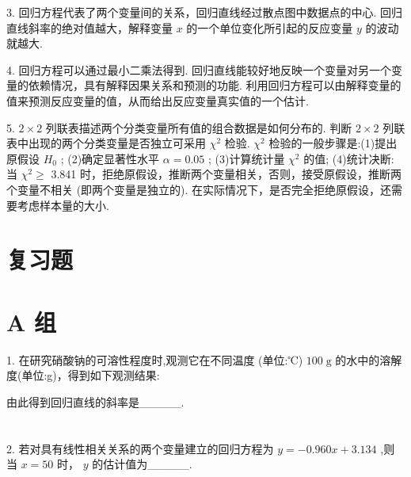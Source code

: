 \documentclass[10pt]{article}
\begin{document}
3. 回归方程代表了两个变量间的关系，回归直线经过散点图中数据点的中心. 回归直线斜率的绝对值越大，解释变量 \(x\) 的一个单位变化所引起的反应变量 \(y\) 的波动就越大.

4. 回归方程可以通过最小二乘法得到. 回归直线能较好地反映一个变量对另一个变量的依赖情况，具有解释因果关系和预测的功能. 利用回归方程可以由解释变量的值来预测反应变量的值，从而给出反应变量真实值的一个估计.

5. \(2 \times  2\) 列联表描述两个分类变量所有值的组合数据是如何分布的. 判断 \(2 \times  2\) 列联表中出现的两个分类变量是否独立可采用 \({\chi }^{2}\) 检验. \({\chi }^{2}\) 检验的一般步骤是:(1)提出原假设 \({H}_{0}\) ; (2)确定显著性水平 \(\alpha  = {0.05}\) ; (3)计算统计量 \({\chi }^{2}\) 的值; (4)统计决断: 当 \({\chi }^{2} \geq\) 3.841 时，拒绝原假设，推断两个变量相关，否则，接受原假设，推断两个变量不相关 (即两个变量是独立的). 在实际情况下，是否完全拒绝原假设，还需要考虑样本量的大小.

\section*{复习题}

\section*{A 组}

1. 在研究硝酸钠的可溶性程度时,观测它在不同温度 (单位:℃) \({100}\mathrm{\;g}\) 的水中的溶解度(单位:g)，得到如下观测结果:

\begin{center}
\end{center}

由此得到回归直线的斜率是\_\_\_\_\_.

\section*{}

2. 若对具有线性相关关系的两个变量建立的回归方程为 \(y =  - {0.960x} + {3.134}\) ,则当 \(x = {50}\) 时， \(y\) 的估计值为\_\_\_\_\_.
\end{document}
